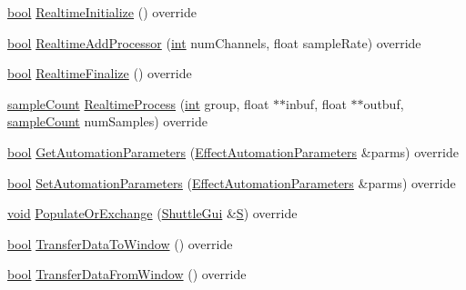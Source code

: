 \begin{DoxyCompactItemize}
\item 
\hyperlink{mac_2config_2i386_2lib-src_2libsoxr_2soxr-config_8h_abb452686968e48b67397da5f97445f5b}{bool} \hyperlink{class_effect_wahwah_ad392ceed52e3f6db617517613d519418}{Realtime\+Initialize} () override
\item 
\hyperlink{mac_2config_2i386_2lib-src_2libsoxr_2soxr-config_8h_abb452686968e48b67397da5f97445f5b}{bool} \hyperlink{class_effect_wahwah_ae6c179b6e1a7375b5095dbd70d1958c1}{Realtime\+Add\+Processor} (\hyperlink{xmltok_8h_a5a0d4a5641ce434f1d23533f2b2e6653}{int} num\+Channels, float sample\+Rate) override
\item 
\hyperlink{mac_2config_2i386_2lib-src_2libsoxr_2soxr-config_8h_abb452686968e48b67397da5f97445f5b}{bool} \hyperlink{class_effect_wahwah_a94aac702d59872234df9a231951d3be2}{Realtime\+Finalize} () override
\item 
\hyperlink{include_2audacity_2_types_8h_afa427e1f521ea5ec12d054e8bd4d0f71}{sample\+Count} \hyperlink{class_effect_wahwah_acb442631d04be7e5e50a41c14b34cacf}{Realtime\+Process} (\hyperlink{xmltok_8h_a5a0d4a5641ce434f1d23533f2b2e6653}{int} group, float $\ast$$\ast$inbuf, float $\ast$$\ast$outbuf, \hyperlink{include_2audacity_2_types_8h_afa427e1f521ea5ec12d054e8bd4d0f71}{sample\+Count} num\+Samples) override
\item 
\hyperlink{mac_2config_2i386_2lib-src_2libsoxr_2soxr-config_8h_abb452686968e48b67397da5f97445f5b}{bool} \hyperlink{class_effect_wahwah_ae5304fea47e36415a411cc1f4f7befd0}{Get\+Automation\+Parameters} (\hyperlink{class_effect_automation_parameters}{Effect\+Automation\+Parameters} \&parms) override
\item 
\hyperlink{mac_2config_2i386_2lib-src_2libsoxr_2soxr-config_8h_abb452686968e48b67397da5f97445f5b}{bool} \hyperlink{class_effect_wahwah_a9a4304a8d5d0d8c6fa6e269a094b0536}{Set\+Automation\+Parameters} (\hyperlink{class_effect_automation_parameters}{Effect\+Automation\+Parameters} \&parms) override
\item 
\hyperlink{sound_8c_ae35f5844602719cf66324f4de2a658b3}{void} \hyperlink{class_effect_wahwah_a85b4d7dc21fda05aa70d052a89a99b6e}{Populate\+Or\+Exchange} (\hyperlink{class_shuttle_gui}{Shuttle\+Gui} \&\hyperlink{xlftab_8c_af933676109efed7ab34cea71d748a517}{S}) override
\item 
\hyperlink{mac_2config_2i386_2lib-src_2libsoxr_2soxr-config_8h_abb452686968e48b67397da5f97445f5b}{bool} \hyperlink{class_effect_wahwah_a7bdb14950e9b5504a9b6f62e1a3d0625}{Transfer\+Data\+To\+Window} () override
\item 
\hyperlink{mac_2config_2i386_2lib-src_2libsoxr_2soxr-config_8h_abb452686968e48b67397da5f97445f5b}{bool} \hyperlink{class_effect_wahwah_a9cfed9e810695c0af55dc520918d5655}{Transfer\+Data\+From\+Window} () override
\end{DoxyCompactItemize}
